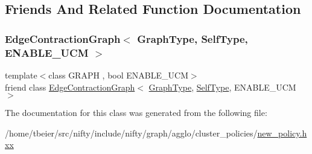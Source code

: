 \subsection{Friends And Related Function Documentation}
\mbox{\label{classnifty_1_1graph_1_1agglo_1_1NewPolicy_a6939aa4c6113ba9c44fd5e048687ba92}} 
\subsubsection{\texorpdfstring{Edge\+Contraction\+Graph$<$ Graph\+Type, Self\+Type, E\+N\+A\+B\+L\+E\+\_\+\+U\+C\+M $>$}{EdgeContractionGraph< GraphType, SelfType, ENABLE\_UCM >}}
{\footnotesize\ttfamily template$<$class G\+R\+A\+PH , bool E\+N\+A\+B\+L\+E\+\_\+\+U\+CM$>$ \\
friend class \hyperlink{classnifty_1_1graph_1_1EdgeContractionGraph}{Edge\+Contraction\+Graph}$<$ \hyperlink{classnifty_1_1graph_1_1agglo_1_1NewPolicy_ac8758b09604128d2bded40975109e808}{Graph\+Type}, \hyperlink{classnifty_1_1graph_1_1agglo_1_1NewPolicy}{Self\+Type}, E\+N\+A\+B\+L\+E\+\_\+\+U\+CM $>$\hspace{0.3cm}{\ttfamily [friend]}}



The documentation for this class was generated from the following file\+:\begin{DoxyCompactItemize}
\item 
/home/tbeier/src/nifty/include/nifty/graph/agglo/cluster\+\_\+policies/\hyperlink{new__policy_8hxx}{new\+\_\+policy.\+hxx}\end{DoxyCompactItemize}
